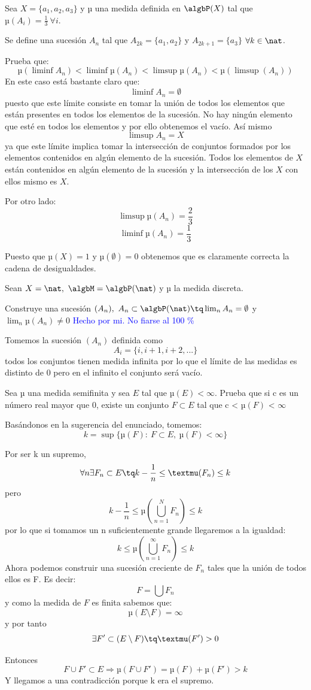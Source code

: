 \begin{problem}[7]
Sea $X=\{a_1, a_2, a_3\}$ y µ una medida definida en $\algbP (X)$ tal que $µ(A_i)=\frac{1}{3} \ \forall i$.

Se define una sucesión $A_n$ tal que $A_{2k}=\{a_1, a_2\}$ y $A_{2k+1}=\{a_3\}$ $\forall k \in \nat$.

Prueba que:
\[µ(\liminf A_n) < \liminf µ(A_n) < \limsup µ(A_n) < µ(\limsup(A_n))\]
\solution
En este caso está bastante claro que:
\[\liminf A_n = \emptyset\]
puesto que este límite consiste en tomar la unión de todos los elementos que están presentes en todos los elementos de la sucesión. No hay ningún elemento que esté en todos los elementos y por ello obtenemos el vacío.
Así mismo
\[\limsup A_n = X\]
ya que este límite implica tomar la intersección de conjuntos formados por los elementos contenidos en algún elemento de la sucesión. Todos los elementos de $X$ están contenidos en algún elemento de la sucesión y la intersección de los $X$ con ellos mismo es $X$.

Por otro lado:
\[\limsup µ(A_n) = \frac{2}{3}\]
\[\liminf µ(A_n) = \frac{1}{3}\]

Puesto que $µ(X) =1$ y $µ(\emptyset)=0$ obtenemos que es claramente correcta la cadena de desigualdades.
\end{problem}


\begin{problem}[8]
Sean $X=\nat, \ \algbM=\algbP(\nat)$ y µ la medida discreta.

Construye una sucesión $(A_n), \ A_n\subset \algbP(\nat) \tq \lim_n A_n=\emptyset$ y $\lim_n µ(A_n) \neq 0$
\solution
\textcolor{blue}{Hecho por mi. No fiarse al 100 \%}

Tomemos la sucesión $(A_n)$ definida como
\[A_i = \{i, i+1, i+2,...\}\]
todos los conjuntos tienen medida infinita por lo que el límite de las medidas es distinto de 0 pero en el infinito el conjunto será vacío.
\end{problem}


\begin{problem}[9]
Sea µ una medida semifinita y sea $E$ tal que $µ(E) < \infty$. Prueba que si c es un número real mayor que 0, existe un conjunto $F \subset E$ tal que c < $µ(F)$ < $\infty$

\solution
Basándonos en la sugerencia del enunciado, tomemos:
\[k=\sup \{µ(F): \ F \subset E, \ µ(F)< \infty \}\]

Por ser k un supremo,
\[\forall n \exists F_n \subset E \tq k-\frac{1}{n} \leq µ(F_n) \leq k\]
pero
\[k - \frac{1}{n} \leq µ(\bigcup_{n=1}^{N} F_n) \leq k\]
por lo que si tomamos un n suficientemente grande llegaremos a la igualdad:
\[k \leq µ(\bigcup_{n=1}^{\infty}F_n) \leq k\]
Ahora podemos construir una sucesión creciente de $F_n$ tales que la unión de todos ellos es F. Es decir:
\[F= \bigcup F_n\]
y como la medida de $F$ es finita sabemos que:
\[µ(E \setminus F)= \infty\]
y por tanto
\[\exists F'\subset (E \setminus F) \tq µ(F')> 0\]

Entonces
\[F \cup F' \subset E \Rightarrow µ(F \cup F')=µ(F)+µ(F') > k\]
Y llegamos a una contradicción porque k era el supremo.


\end{problem}

